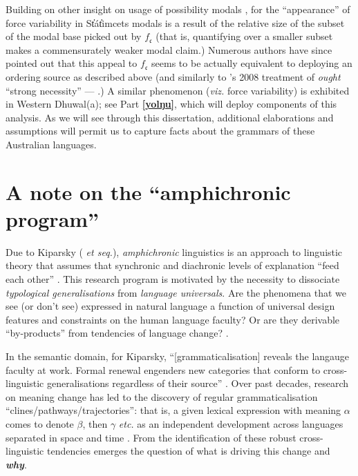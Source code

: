 \documentclass[11pt,dvipsnames]{report}
\begin{document}
Building on other insight on usage of possibility modals \citep[notably][]{Klinedinst2007}, for \citet{Rullmann2008} the ``appearance'' of force variability in St̓át̓imcets modals is a result of the relative size of the subset of the modal base picked out by $ f_{\mathfrak c} $ (that is, quantifying over a smaller subset makes a commensurately weaker modal claim.) Numerous authors have since pointed out that this appeal to $ f_{\mathfrak c} $ seems to be actually equivalent to deploying an ordering source as described above (and similarly to \citeauthor{VonFintel2008}'s 2008 treatment of \textit{ought} ``strong necessity'' --- \citealp[see][]{Portner2009,Matthewson2010,Peterson2008}.)
 A similar phenomenon (\textit{viz.} force variability) is exhibited in Western Dhuwal(a); see Part \textbf{\ref{yolŋu}}, which will deploy components of this analysis. As we will see through this dissertation, additional elaborations and assumptions will permit us to capture facts about the grammars of these Australian languages.

\section{A note on the ``amphichronic program''}\label{amph}

Due to Kiparsky (\citeyear{Kiparsky2006} \textit{et seq.}), \textit{amphichronic} linguistics is an approach to linguistic theory that assumes that synchronic and diachronic levels of explanation ``feed each other'' \citep[see also][]{Bermudez-Otero2013}. This research program is motivated by the necessity to dissociate \textit{typological generalisations} from \textit{language universals}. Are the phenomena that we see (or don't see) expressed in natural language a function of universal design features and constraints on the human language faculty? Or are they derivable ``by-products'' from tendencies of language change? \citep[see also][]{Anderson2008,Anderson2016a}.%

In the semantic domain, for Kiparsky, ``[grammaticalisation] reveals the langauge faculty at work. Formal renewal engenders new categories that conform to cross-linguistic generalisations regardless of their source'' \citep[73]{Kiparsky2015}. Over past decades, research on meaning change has led to the discovery of regular grammaticalisation ``clines\slash pathways\slash trajectories'': that is, a given lexical expression with meaning $ \alpha $ comes to denote $ \beta $, then $ \gamma $ \textit{etc.} as an independent development across languages separated in space and time \citep[see][]{Deo2015,Eckardt2011}. From the identification of these robust cross-linguistic tendencies emerges the question of what is driving this change and \textbf{\textit{why}}.
\end{document}
